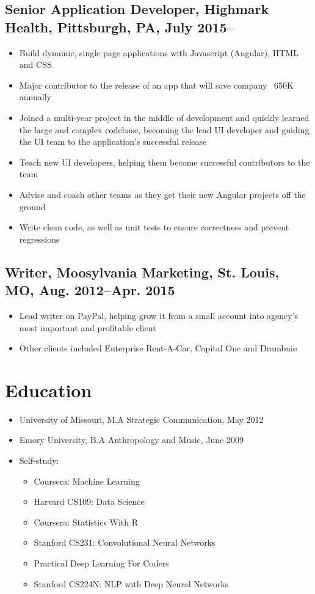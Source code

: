 \documentclass[10pt]{article}
\begin{document}
		\subsection{\normalsize{Senior Application Developer, Highmark Health, Pittsburgh, PA, July 2015--}}
		\begin{itemize}[noitemsep]
		\item Build dynamic, single page applications with Javascript (Angular), HTML and CSS
		\item Major contributor to the release of an app that will save company ~650K annually
		\item Joined a multi-year project in the middle of development and quickly learned the large and complex codebase, becoming the lead UI developer and guiding the UI team to the application's successful release
		\item Teach new UI developers, helping them become successful contributors to the team
		\item Advise and coach other teams as they get their new Angular projects off the ground
		\item Write clean code, as well as unit tests to ensure correctness and prevent regressions
		\end{itemize}
		
	\subsection{\normalsize{Writer, Moosylvania Marketing, St. Louis, MO, Aug. 2012--Apr. 2015}}
	\begin{itemize}[noitemsep]
		\item Lead writer on PayPal, helping grow it from a small account into agency\rq s most important and profitable client
		\item Other clients included Enterprise Rent-A-Car, Capital One and Drambuie
	\end{itemize}
	
	\section{Education}
		\begin{itemize}[noitemsep]
			\item University of Missouri, M.A Strategic Communication, May 2012
			\item Emory University, B.A Anthropology and Music, June 2009
			\item Self-study:
				\begin{itemize}[noitemsep]
						\item Coursera: Machine Learning 
						\item Harvard CS109: Data Science
						\item Coursera: Statistics With R 
						\item Stanford CS231: Convolutional Neural Networks
						\item Practical Deep Learning For Coders 
						\item Stanford CS224N: NLP with Deep Neural Networks
				\end{itemize}
					
				
		\end{itemize}
	
\end{document}
